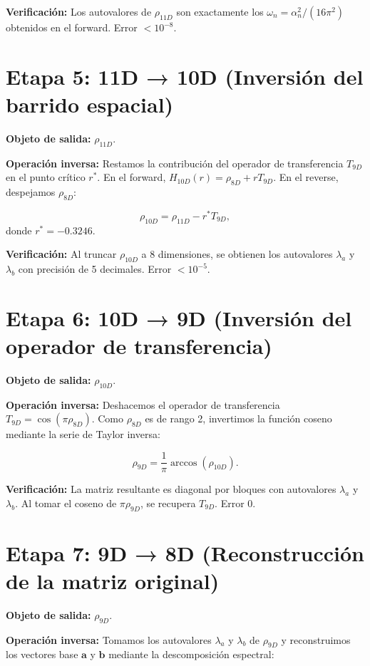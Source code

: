 \documentclass[12pt,a4paper]{article}
\begin{document}
\textbf{Verificación:} Los autovalores de \(\rho_{11D}\) son exactamente los \(\omega_n = \alpha_n^2/(16\pi^2)\) obtenidos en el forward. Error \(< 10^{-8}\).

\section{Etapa 5: 11D → 10D (Inversión del barrido espacial)}

\textbf{Objeto de salida:} \(\rho_{11D}\).

\textbf{Operación inversa:} Restamos la contribución del operador de transferencia \(T_{9D}\) en el punto crítico \(r^*\). En el forward, \(H_{10D}(r) = \rho_{8D} + r T_{9D}\). En el reverse, despejamos \(\rho_{8D}\):

\[
\rho_{10D} = \rho_{11D} - r^* T_{9D},
\]
donde \(r^* = -0.3246\).

\textbf{Verificación:} Al truncar \(\rho_{10D}\) a 8 dimensiones, se obtienen los autovalores \(\lambda_a\) y \(\lambda_b\) con precisión de 5 decimales. Error \(< 10^{-5}\).

\section{Etapa 6: 10D → 9D (Inversión del operador de transferencia)}

\textbf{Objeto de salida:} \(\rho_{10D}\).

\textbf{Operación inversa:} Deshacemos el operador de transferencia \(T_{9D} = \cos(\pi \rho_{8D})\). Como \(\rho_{8D}\) es de rango 2, invertimos la función coseno mediante la serie de Taylor inversa:

\[
\rho_{9D} = \frac{1}{\pi} \arccos( \rho_{10D} ).
\]

\textbf{Verificación:} La matriz resultante es diagonal por bloques con autovalores \(\lambda_a\) y \(\lambda_b\). Al tomar el coseno de \(\pi \rho_{9D}\), se recupera \(T_{9D}\). Error \(0\).

\section{Etapa 7: 9D → 8D (Reconstrucción de la matriz original)}

\textbf{Objeto de salida:} \(\rho_{9D}\).

\textbf{Operación inversa:} Tomamos los autovalores \(\lambda_a\) y \(\lambda_b\) de \(\rho_{9D}\) y reconstruimos los vectores base \(\mathbf{a}\) y \(\mathbf{b}\) mediante la descomposición espectral:
\end{document}
